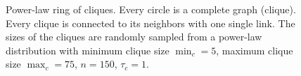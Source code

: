 \begin{figure}[htb]
\centering
{}
\caption{Power-law ring of cliques. Every circle is a complete graph (clique). Every clique is connected to its neighbors with one single link. The sizes of the cliques are randomly sampled from a power-law distribution with minimum clique size $\min_c=5$, maximum clique size $\max_c=75$, $n=150$, $\tau_c=1$.}
\label{fig:ring_of_clique_powerlaw}
\end{figure}